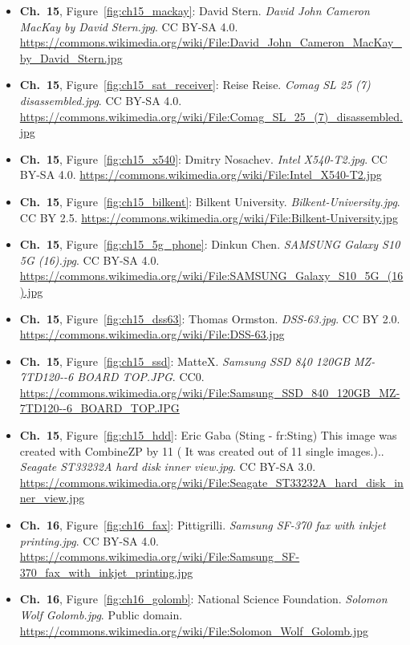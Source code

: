 \begin{small}
\begin{itemize}[leftmargin=0pt,itemsep=2pt,label={}]
\item \textbf{Ch.~15}, Figure~\ref{fig:ch15_mackay}: David Stern. \emph{David John Cameron MacKay by David Stern.\allowbreak{}jpg}. CC BY-SA 4.0. \url{https://commons.wikimedia.org/wiki/File:David_John_Cameron_MacKay_by_David_Stern.jpg}
\item \textbf{Ch.~15}, Figure~\ref{fig:ch15_sat_receiver}: Reise Reise. \emph{Comag SL 25 (7) disassembled.\allowbreak{}jpg}. CC BY-SA 4.0. \url{https://commons.wikimedia.org/wiki/File:Comag_SL_25_(7)_disassembled.jpg}
\item \textbf{Ch.~15}, Figure~\ref{fig:ch15_x540}: Dmitry Nosachev. \emph{Intel X540-\allowbreak{}T2.\allowbreak{}jpg}. CC BY-SA 4.0. \url{https://commons.wikimedia.org/wiki/File:Intel_X540-T2.jpg}
\item \textbf{Ch.~15}, Figure~\ref{fig:ch15_bilkent}: Bilkent University. \emph{Bilkent-\allowbreak{}University.\allowbreak{}jpg}. CC BY 2.5. \url{https://commons.wikimedia.org/wiki/File:Bilkent-University.jpg}
\item \textbf{Ch.~15}, Figure~\ref{fig:ch15_5g_phone}: Dinkun Chen. \emph{SAMSUNG Galaxy S10 5G (16).\allowbreak{}jpg}. CC BY-SA 4.0. \url{https://commons.wikimedia.org/wiki/File:SAMSUNG_Galaxy_S10_5G_(16).jpg}
\item \textbf{Ch.~15}, Figure~\ref{fig:ch15_dss63}: Thomas Ormston. \emph{DSS-\allowbreak{}63.\allowbreak{}jpg}. CC BY 2.0. \url{https://commons.wikimedia.org/wiki/File:DSS-63.jpg}
\item \textbf{Ch.~15}, Figure~\ref{fig:ch15_ssd}: MatteX. \emph{Samsung SSD 840 120GB MZ-\allowbreak{}7TD120-\allowbreak{}-\allowbreak{}6 BOARD TOP.\allowbreak{}JPG}. CC0. \url{https://commons.wikimedia.org/wiki/File:Samsung_SSD_840_120GB_MZ-7TD120--6_BOARD_TOP.JPG}
\item \textbf{Ch.~15}, Figure~\ref{fig:ch15_hdd}: Eric Gaba (Sting - fr:Sting) This image was created with CombineZP by 11 ( It was created out of 11 single images.).. \emph{Seagate ST33232A hard disk inner view.\allowbreak{}jpg}. CC BY-SA 3.0. \url{https://commons.wikimedia.org/wiki/File:Seagate_ST33232A_hard_disk_inner_view.jpg}
\item \textbf{Ch.~16}, Figure~\ref{fig:ch16_fax}: Pittigrilli. \emph{Samsung SF-\allowbreak{}370 fax with inkjet printing.\allowbreak{}jpg}. CC BY-SA 4.0. \url{https://commons.wikimedia.org/wiki/File:Samsung_SF-370_fax_with_inkjet_printing.jpg}
\item \textbf{Ch.~16}, Figure~\ref{fig:ch16_golomb}: National Science Foundation. \emph{Solomon Wolf Golomb.\allowbreak{}jpg}. Public domain. \url{https://commons.wikimedia.org/wiki/File:Solomon_Wolf_Golomb.jpg}

\end{itemize}
\end{small}
